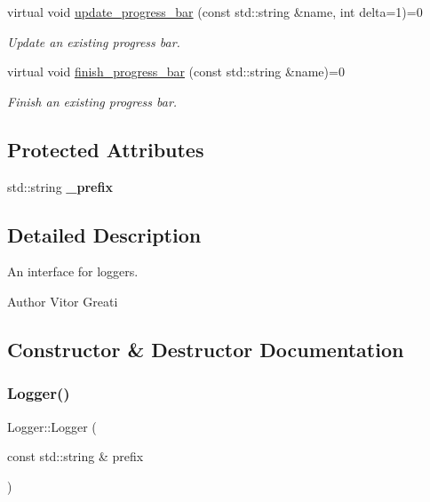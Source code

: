 \begin{DoxyCompactItemize}
\mbox{\label{class_logger_a97b9f431c10b909bdda75b5dbbfd776c}} 
virtual void \mbox{\hyperlink{class_logger_a97b9f431c10b909bdda75b5dbbfd776c}{update\+\_\+progress\+\_\+bar}} (const std\+::string \&name, int delta=1)=0
\begin{DoxyCompactList}\small\item\em Update an existing progress bar. \end{DoxyCompactList}\item 
\mbox{\label{class_logger_afeee1dc03b3fc81bf4b0075d8b8a87bc}} 
virtual void \mbox{\hyperlink{class_logger_afeee1dc03b3fc81bf4b0075d8b8a87bc}{finish\+\_\+progress\+\_\+bar}} (const std\+::string \&name)=0
\begin{DoxyCompactList}\small\item\em Finish an existing progress bar. \end{DoxyCompactList}\end{DoxyCompactItemize}
\subsection*{Protected Attributes}
\begin{DoxyCompactItemize}
\item 
\mbox{\label{class_logger_a0ae9b0eba99d9b371b921558a1f92942}} 
std\+::string {\bfseries \+\_\+prefix}
\end{DoxyCompactItemize}


\subsection{Detailed Description}
An interface for loggers. 

\begin{DoxyAuthor}{Author}
Vitor Greati 
\end{DoxyAuthor}


\subsection{Constructor \& Destructor Documentation}
\mbox{\label{class_logger_a5eb8bf6f6a9111e62a7b2fee03ef7541}} 
\subsubsection{\texorpdfstring{Logger()}{Logger()}}
{\footnotesize\ttfamily Logger\+::\+Logger (\begin{DoxyParamCaption}\item[{const std\+::string \&}]{prefix }\end{DoxyParamCaption})\hspace{0.3cm}{\ttfamily [inline]}}



